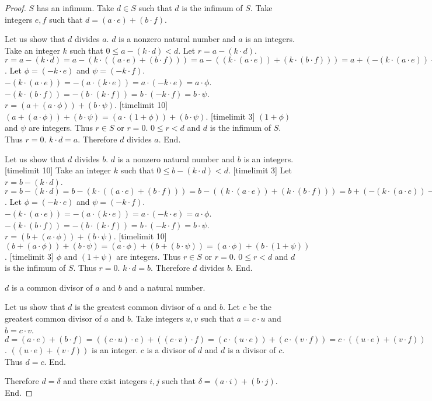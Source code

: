 \documentclass{article}
\begin{document}
\begin{forthel}
\begin{proof}
  $S$ has an infimum.
  Take $d \in S$ such that $d$ is the infimum of $S$.
  Take integers $e,f$ such that $d = (a \cdot e) + (b \cdot f)$.

  Let us show that $d$ divides $a$.
    $d$ is a nonzero natural number and $a$ is an integers.
    Take an integer $k$ such that $0 \leq a - (k \cdot d) < d$. Let $r = a - (k \cdot d)$.
    $r = a - (k \cdot d) = a - (k \cdot ((a \cdot e) + (b \cdot f))) 
    = a - ((k \cdot (a \cdot e)) + (k \cdot (b \cdot f)))
    = a + (-(k \cdot (a \cdot e)) - (k \cdot (b \cdot f)))$.
    Let $\phi = (-k \cdot e)$ and $\psi = (-k \cdot f)$.
    $-(k \cdot (a \cdot e)) = -(a \cdot (k \cdot e)) = a \cdot (-k \cdot e) = a \cdot \phi$.
    $- (k \cdot (b \cdot f)) = -(b \cdot (k \cdot f)) = b \cdot (-k \cdot f) = b \cdot \psi$.
    $r = (a + (a \cdot \phi)) + (b \cdot \psi)$. [timelimit 10]
    $(a + (a \cdot \phi)) + (b \cdot \psi)= (a \cdot (1 + \phi)) + (b \cdot \psi)$. [timelimit 3]
    $(1 + \phi)$ and $\psi$ are integers. Thus $r \in S$ or $r = 0$. $0 \leq r < d$ and $d$ is the infimum of $S$.
    Thus $r = 0$. $k \cdot d = a$. Therefore $d$ divides $a$.
  End.

  Let us show that $d$ divides $b$.
    $d$ is a nonzero natural number and $b$ is an integers.
    [timelimit 10] Take an integer $k$ such that $0 \leq b - (k \cdot d) < d$. [timelimit 3] Let $r = b - (k \cdot d)$.
    $r = b - (k \cdot d) = b - (k \cdot ((a \cdot e) + (b \cdot f))) 
    = b - ((k \cdot (a \cdot e)) + (k \cdot (b \cdot f)))
    = b + (-(k \cdot (a \cdot e)) - (k \cdot (b \cdot f)))$.
    Let $\phi = (-k \cdot e)$ and $\psi = (-k \cdot f)$.
    $-(k \cdot (a \cdot e)) = -(a \cdot (k \cdot e)) = a \cdot (-k \cdot e) = a \cdot \phi$.
    $- (k \cdot (b \cdot f)) = -(b \cdot (k \cdot f)) = b \cdot (-k \cdot f) = b \cdot \psi$.
    $r = (b + (a \cdot \phi)) + (b \cdot \psi)$. [timelimit 10]
    $(b + (a \cdot \phi)) + (b \cdot \psi) = (a \cdot \phi) + (b + (b \cdot \psi)) = (a \cdot \phi) + (b \cdot (1 + \psi))$. [timelimit 3]
    $\phi$ and $(1+\psi)$ are integers. Thus $r \in S$ or $r = 0$. $0 \leq r < d$ and $d$ is the infimum of $S$.
    Thus $r = 0$. $k \cdot d = b$. Therefore $d$ divides $b$.
  End.


  $d$ is a common divisor of $a$ and $b$ and a natural number.

  Let us show that $d$ is the greatest common divisor of $a$ and $b$.
    Let $c$ be the greatest common divisor of $a$ and $b$. Take integers $u,v$ such that $a = c \cdot u$ and $b = c \cdot v$.
    $d = (a \cdot e) + (b \cdot f)
    = ((c \cdot u) \cdot e) + ((c \cdot v) \cdot f)
    = (c \cdot (u \cdot e)) + (c \cdot (v \cdot f))
    = c \cdot ((u \cdot e) + (v \cdot f))$.
    $((u \cdot e) + (v \cdot f))$ is an integer. $c$ is a divisor of $d$ and $d$ is a divisor of $c$. Thus $d = c$.
  End.
  
  Therefore $d = \delta$ and
  there exist integers $i,j$ such that $\delta = (a \cdot i) + (b \cdot j)$.
End.
\end{proof}

\end{forthel}
\end{document}
